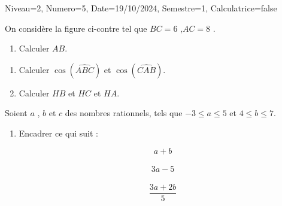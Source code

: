 \documentclass[a4paper,12pt]{article}
\begin{document}
\begin{Maquette}[DS]{Niveau=2, Numero=5, Date=19/10/2024, Semestre=1, Calculatrice=false}

\begin{exercice}
\begin{minipage}{.65\linewidth}
On considère la figure ci-contre tel que $BC=6$ ,$AC=8$ .
\begin{enumerate}
\item{} Calculer  $AB$.

\anserline[4]
\end{enumerate}
\end{minipage}
\begin{minipage}{.35\linewidth}
\end{minipage}
\begin{enumerate}
\item{} Calculer $\cos(\widehat{ABC})$ et $\cos(\widehat{CAB})$.
\begin{multicols}{2}
\anserline[2]
\columnbreak

\anserline[2]
\end{multicols}
\item{} Calculer $HB$ et $HC$ et $HA$.
\begin{multicols}{3}
\anserline[3]
\columnbreak

\anserline[3]
\columnbreak

\anserline[3]
\end{multicols}
\end{enumerate}
\end{exercice}

\begin{exercice}
Soient $a$ , $b$ et $c$ des nombres rationnels, tels que $-3\leq a \leq 5$ et $4\leq b \leq 7$.
\begin{enumerate}
\item{} Encadrer ce qui suit :\vspace{-1cm}
\begin{multicols}{3}
\[a+b\]\\ \anserline[3]
\[3a-5\]\\ \anserline[3]
\[\frac{3a+2b}{5}\]\\ \anserline[3]
\end{multicols}
\end{enumerate}
\end{exercice}



\end{Maquette}
\end{document}
